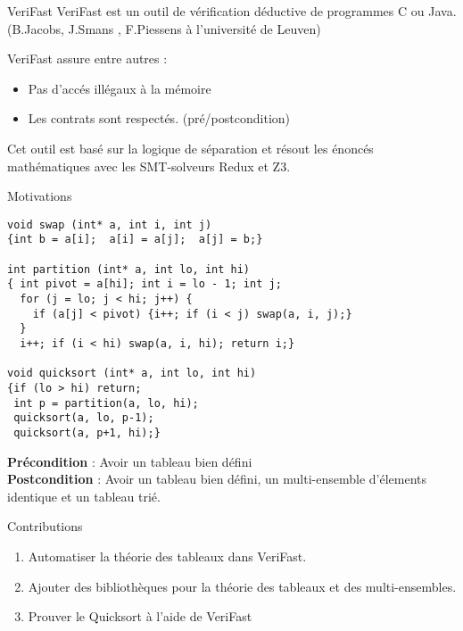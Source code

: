 \documentclass[]{beamer}
\newcommand{\verifast}{VeriFast}
\begin{document}
\begin{frame}{\verifast}
	\verifast{} est un outil de v\'erification d\'eductive de programmes C ou Java. (B.Jacobs, J.Smans , F.Piessens \`a l'universit\'e de Leuven) 
	
	\verifast{} assure entre autres :
	\begin{itemize}
	\item Pas d'acc\'es ill\'egaux \`a la m\'emoire
	\item Les contrats sont respect\'es. (pr\'e/postcondition) 
\end{itemize}	
Cet outil est bas\'e sur la logique de s\'eparation et r\'esout les \'enonc\'es math\'ematiques avec les SMT-solveurs Redux et Z3.
\end{frame}






\begin{frame}[fragile]{Motivations}

\begin{lstlisting}[basicstyle=\footnotesize]
void swap (int* a, int i, int j)
{int b = a[i];  a[i] = a[j];  a[j] = b;}

int partition (int* a, int lo, int hi)
{ int pivot = a[hi]; int i = lo - 1; int j;
  for (j = lo; j < hi; j++) {
    if (a[j] < pivot) {i++; if (i < j) swap(a, i, j);}
  }
  i++; if (i < hi) swap(a, i, hi); return i;}
  
void quicksort (int* a, int lo, int hi)
{if (lo > hi) return;
 int p = partition(a, lo, hi);
 quicksort(a, lo, p-1);
 quicksort(a, p+1, hi);}

		\end{lstlisting}
\textbf{Pr\'econdition} : Avoir un tableau bien d\'efini\\
\textbf{Postcondition} : Avoir un tableau bien d\'efini, un multi-ensemble d'\'elements identique et un tableau tri\'e.
\end{frame}








\begin{frame}{Contributions}
	\begin{enumerate}
		\item Automatiser la th\'eorie des tableaux dans \verifast.
		\item Ajouter des biblioth\`eques pour la th\'eorie des tableaux et des multi-ensembles.
		\item Prouver le Quicksort \`a l'aide de \verifast
	\end{enumerate}
\end{frame}
\end{document}
